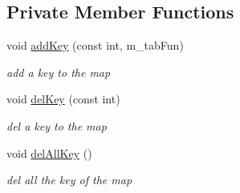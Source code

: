 \subsection*{Private Member Functions}
\begin{DoxyCompactItemize}
\item 
void \hyperlink{class_intro_state_a0148b4872bfee0d3cc6631016ba4e205}{add\+Key} (const int, m\+\_\+tab\+Fun)
\begin{DoxyCompactList}\small\item\em add a key to the map \end{DoxyCompactList}\item 
void \hyperlink{class_intro_state_a99e864ea5ad8b3a4f311fe63caf5e9e6}{del\+Key} (const int)
\begin{DoxyCompactList}\small\item\em del a key to the map \end{DoxyCompactList}\item 
\hypertarget{class_intro_state_af09b259f34fcfca35fd82f9618cbb0ed}{}void \hyperlink{class_intro_state_af09b259f34fcfca35fd82f9618cbb0ed}{del\+All\+Key} ()\label{class_intro_state_af09b259f34fcfca35fd82f9618cbb0ed}

\begin{DoxyCompactList}\small\item\em del all the key of the map \end{DoxyCompactList}\end{DoxyCompactItemize}
